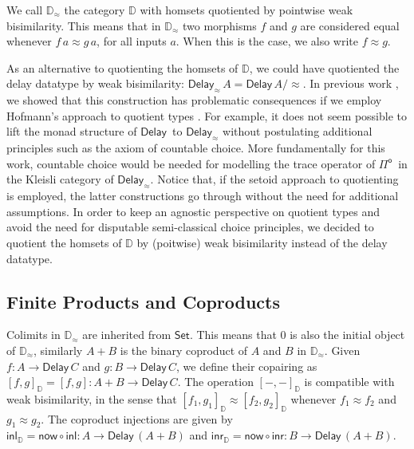 \documentclass[runningheads]{llncs}
\newcommand{\Pio}{$\mathsf{\Pi}^{\mathsf{o}}$}
\newcommand{\Set}{\mathsf{Set}}
\newcommand{\comp}{\circ}
\newcommand{\copair}[2]{[#1,#2]}
\newcommand{\inl}{\mathsf{inl}}
\newcommand{\inr}{\mathsf{inr}}
\newcommand{\Delay}{\mathsf{Delay}\,}
\newcommand{\now}{\mathsf{now}}
\newcommand{\D}{\mathbb{D}}
\newcommand{\Dapprox}{\mathbb{D}_{\approx}}
\newcommand{\copairD}[2]{[#1,#2]_{\D}}
\newcommand{\inlD}{\mathsf{inl}_{\D}}
\newcommand{\inrD}{\mathsf{inr}_{\D}}
\begin{document}
We call $\Dapprox$ the category $\D$ with homsets
quotiented by pointwise weak bisimilarity. This means that in
$\Dapprox$ two morphisms $f$ and $g$ are considered equal whenever
$f \, a \approx g \, a$, for all inputs $a$. When this is the case, we
also write $f \approx g$. 

As an alternative to quotienting the homsets of $\D$, we could have
quotiented the delay datatype by weak bisimilarity:
$\mathsf{Delay}_{\approx}\,A = \Delay A/{\approx}$. In previous work
\cite{ChapmanUV19}, we showed that this construction has problematic
consequences if we employ Hofmann's approach to quotient types
\cite{Hofmann}. For example, it does not seem possible to lift the
monad structure of $\Delay$ to $\mathsf{Delay}_{\approx}$ without
postulating additional principles such as the axiom of countable
choice. More fundamentally for this work, countable choice would be
needed for modelling the trace operator of \Pio\ in the Kleisli
category of $\mathsf{Delay}_{\approx}$. Notice that, if the setoid approach
to quotienting is employed, the latter constructions go through
without the need for additional assumptions. In order to keep an
agnostic perspective on quotient types and avoid the need for
disputable semi-classical choice principles, we decided to quotient
the homsets of $\D$ by (poitwise) weak bisimilarity instead of the
delay datatype.

\subsection{Finite Products and Coproducts}
\label{sec:prod}

Colimits in $\Dapprox$ are inherited from $\Set$. This means that 0 is
also the initial object of $\Dapprox$, similarly $A + B$ is the
binary coproduct of $A$ and $B$ in $\Dapprox$. Given $f : A \to
\Delay C$ and $g : B \to \Delay C$, we define their copairing as
$\copairD f g = \copair f g : A + B \to \Delay C$. The operation
$\copairD - -$ is compatible with weak bisimilarity, in the sense that
$\copairD{f_1}{g_1} \approx \copairD{f_2}{g_2}$ whenever $f_1 \approx f_2$
and $g_1 \approx g_2$.
The coproduct
injections are given by $\inlD = \now \comp \inl : A \to \Delay (A +
B)$ and $\inrD = \now \comp \inr : B \to \Delay (A + B)$.
\end{document}
